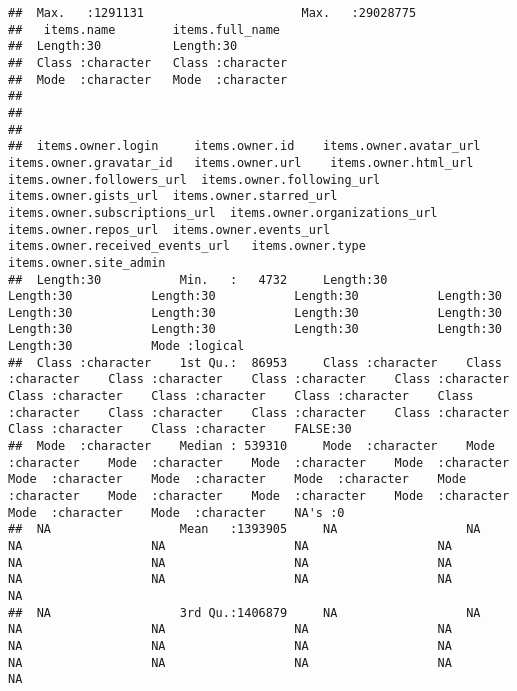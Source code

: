 \documentclass{article}\usepackage[]{graphicx}\usepackage[]{color}
\makeatletter
\newenvironment{kframe}{%
 \def\at@end@of@kframe{}%
 \ifinner\ifhmode%
  \def\at@end@of@kframe{\end{minipage}}%
  \begin{minipage}{\columnwidth}%
 \fi\fi%
 \def\FrameCommand##1{\hskip\@totalleftmargin \hskip-\fboxsep
 \colorbox{shadecolor}{##1}\hskip-\fboxsep
     \hskip-\linewidth \hskip-\@totalleftmargin \hskip\columnwidth}%
 \MakeFramed {\advance\hsize-\width
   \@totalleftmargin\z@ \linewidth\hsize
   \@setminipage}}%
 {\par\unskip\endMakeFramed%
 \at@end@of@kframe}
\newenvironment{knitrout}{}{} %
\makeatother
\begin{document}
\begin{knitrout}
\begin{kframe}
\begin{verbatim}
##  Max.   :1291131                      Max.   :29028775  
##   items.name        items.full_name   
##  Length:30          Length:30         
##  Class :character   Class :character  
##  Mode  :character   Mode  :character  
##                                       
##                                       
##                                       
##  items.owner.login     items.owner.id    items.owner.avatar_url  items.owner.gravatar_id   items.owner.url    items.owner.html_url  items.owner.followers_url  items.owner.following_url  items.owner.gists_url  items.owner.starred_url  items.owner.subscriptions_url  items.owner.organizations_url  items.owner.repos_url  items.owner.events_url  items.owner.received_events_url   items.owner.type   items.owner.site_admin
##  Length:30           Min.   :   4732     Length:30           Length:30           Length:30           Length:30           Length:30           Length:30           Length:30           Length:30           Length:30           Length:30           Length:30           Length:30           Length:30           Length:30           Mode :logical                                                                                    
##  Class :character    1st Qu.:  86953     Class :character    Class :character    Class :character    Class :character    Class :character    Class :character    Class :character    Class :character    Class :character    Class :character    Class :character    Class :character    Class :character    Class :character    FALSE:30                                                                                         
##  Mode  :character    Median : 539310     Mode  :character    Mode  :character    Mode  :character    Mode  :character    Mode  :character    Mode  :character    Mode  :character    Mode  :character    Mode  :character    Mode  :character    Mode  :character    Mode  :character    Mode  :character    Mode  :character    NA's :0                                                                                          
##  NA                  Mean   :1393905     NA                  NA                  NA                  NA                  NA                  NA                  NA                  NA                  NA                  NA                  NA                  NA                  NA                  NA                  NA                                                                                               
##  NA                  3rd Qu.:1406879     NA                  NA                  NA                  NA                  NA                  NA                  NA                  NA                  NA                  NA                  NA                  NA                  NA                  NA                  NA                                                                                               

\end{verbatim}
\end{kframe}
\end{knitrout}
\end{document}

